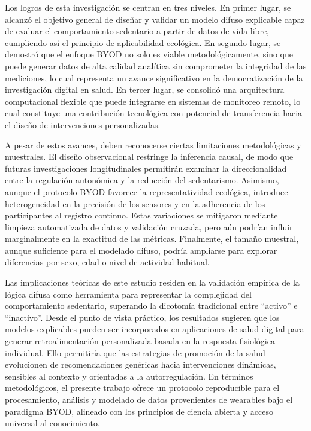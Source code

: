 Los logros de esta investigación se centran en tres niveles. En primer lugar, se alcanzó el objetivo general de diseñar y validar un modelo difuso explicable capaz de evaluar el comportamiento sedentario a partir de datos de vida libre, cumpliendo así el principio de aplicabilidad ecológica. En segundo lugar, se demostró que el enfoque BYOD no solo es viable metodológicamente, sino que puede generar datos de alta calidad analítica sin comprometer la integridad de las mediciones, lo cual representa un avance significativo en la democratización de la investigación digital en salud. En tercer lugar, se consolidó una arquitectura computacional flexible que puede integrarse en sistemas de monitoreo remoto, lo cual constituye una contribución tecnológica con potencial de transferencia hacia el diseño de intervenciones personalizadas.

A pesar de estos avances, deben reconocerse ciertas limitaciones metodológicas y muestrales. El diseño observacional restringe la inferencia causal, de modo que futuras investigaciones longitudinales permitirán examinar la direccionalidad entre la regulación autonómica y la reducción del sedentarismo. Asimismo, aunque el protocolo BYOD favorece la representatividad ecológica, introduce heterogeneidad en la precisión de los sensores y en la adherencia de los participantes al registro continuo. Estas variaciones se mitigaron mediante limpieza automatizada de datos y validación cruzada, pero aún podrían influir marginalmente en la exactitud de las métricas. Finalmente, el tamaño muestral, aunque suficiente para el modelado difuso, podría ampliarse para explorar diferencias por sexo, edad o nivel de actividad habitual.

Las implicaciones teóricas de este estudio residen en la validación empírica de la lógica difusa como herramienta para representar la complejidad del comportamiento sedentario, superando la dicotomía tradicional entre ``activo'' e ``inactivo''. Desde el punto de vista práctico, los resultados sugieren que los modelos explicables pueden ser incorporados en aplicaciones de salud digital para generar retroalimentación personalizada basada en la respuesta fisiológica individual. Ello permitiría que las estrategias de promoción de la salud evolucionen de recomendaciones genéricas hacia intervenciones dinámicas, sensibles al contexto y orientadas a la autorregulación. En términos metodológicos, el presente trabajo ofrece un protocolo reproducible para el procesamiento, análisis y modelado de datos provenientes de wearables bajo el paradigma BYOD, alineado con los principios de ciencia abierta y acceso universal al conocimiento.

